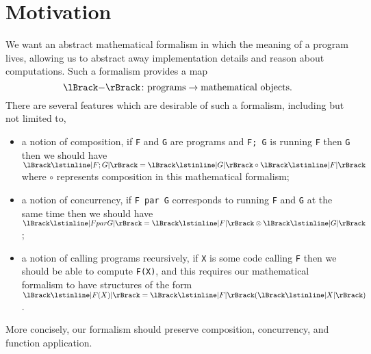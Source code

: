\documentclass[fleqn]{NotesClass}
\DeclarePairedDelimiter{\denotes}{\lBrack}{\rBrack}
\begin{document}
    \section{Motivation}
    We want an abstract mathematical formalism in which the meaning of a program lives, allowing us to abstract away implementation details and reason about computations.
    Such a formalism provides a map
    \begin{equation}
        \denotes{-} \colon \text{programs} \to \text{mathematical objects}.
    \end{equation}
    There are several features which are desirable of such a formalism, including but not limited to,
    \begin{itemize}
        \item a notion of composition, if \lstinline|F| and \lstinline|G| are programs and \lstinline|F; G| is running \lstinline|F| then \lstinline|G| then we should have \(\denotes{\lstinline|F; G|} = \denotes{\lstinline|G|} \circ \denotes{\lstinline|F|}\) where \(\circ\) represents composition in this mathematical formalism;
        \item a notion of concurrency, if \lstinline|F par G| corresponds to running \lstinline|F| and \lstinline|G| at the same time then we should have \(\denotes{\lstinline|F par G|} = \denotes{\lstinline|F|} \otimes \denotes{\lstinline|G|}\);
        \item a notion of calling programs recursively, if \lstinline|X| is some code calling \lstinline|F| then we should be able to compute \lstinline|F(X)|, and this requires our mathematical formalism to have structures of the form \(\denotes{\lstinline|F(X)|} = \denotes{\lstinline|F|}(\denotes{\lstinline|X|})\).
    \end{itemize}
    More concisely, our formalism should preserve composition, concurrency, and function application.
    
\end{document}
